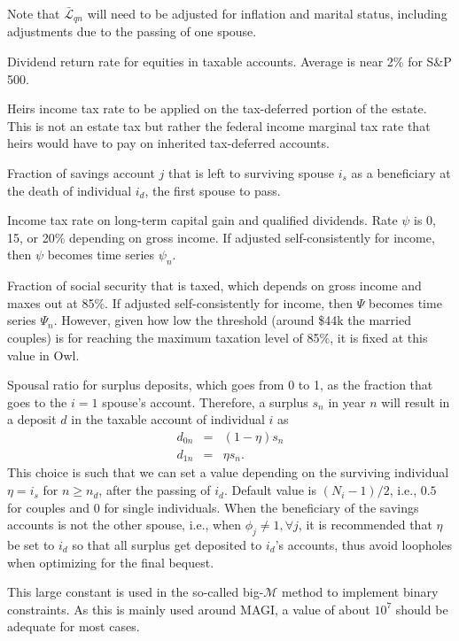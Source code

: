 \documentclass{report}[fleqn,12pt]
\begin{document}
\begin{description}[leftmargin=4em,style=multiline]
        Note that $\bar{\mathcal{L}}_{qn}$ will need to be adjusted for inflation and marital status,
        including adjustments due to the passing of one spouse.
\item [$\mu$]
	Dividend return rate for equities in taxable accounts. Average is near 2\% for S\&P 500.
\item [$\nu$]
	Heirs income tax rate to be applied on the tax-deferred portion of the estate. This is not an estate tax
	but rather the federal income marginal tax rate that heirs would have to pay on inherited tax-deferred accounts.
\item [$\phi_j$]
	Fraction of savings account $j$ that is left to surviving spouse $i_s$ as a beneficiary
	at the death of individual $i_d$, the first spouse to pass.
\item [$\psi$]
	Income tax rate on long-term capital gain and qualified dividends. Rate $\psi$ is 0, 15, or 20\%
	depending on gross income. If adjusted self-consistently for income, then $\psi$ becomes
 	time series $\psi_n$.
\item [$\Psi$]
	Fraction of social security that is taxed, which depends on gross income and maxes out at 85\%.
        If adjusted self-consistently for income, then $\Psi$ becomes time series $\Psi_n$. However,
	given how low the threshold (around \$44k the married couples) is for reaching the
	maximum taxation level of 85\%, it is fixed at this value in Owl.
\item [$\eta$]
	Spousal ratio for surplus deposits, which goes from 0 to 1, as the fraction
	that goes to the $i = 1$ spouse's account. Therefore, a surplus $s_n$ in year $n$
	will result in a deposit $d$ in the taxable account of individual $i$ as
	\begin{eqnarray}
		\label{Eq:eta}
		d_{0n} & = & (1 - \eta) s_n \nonumber\\
		d_{1n} & = & \eta s_n.
	\end{eqnarray}
	This choice is such that we can set a value depending on the surviving
	individual $\eta = i_s$ for $n \ge n_d$, after the passing of $i_d$.
	Default value is $(N_i - 1)/2$, i.e., $0.5$ for couples and $0$ for single individuals.
	When the beneficiary of the savings accounts is not the other spouse, i.e., 
	when $\phi_j \neq 1, \forall j$, it is recommended that $\eta$ be set to $i_d$ so that
	all surplus get deposited to $i_d$'s accounts,
	thus avoid loopholes when optimizing for the final bequest.
\item[$\mathcal{M}$]
	This large constant is used in the so-called big-$\mathcal{M}$ method to implement
	binary constraints. As this is mainly used around MAGI, a value of about $10^7$ should
	be adequate for most cases.
\end{description}
\end{document}
